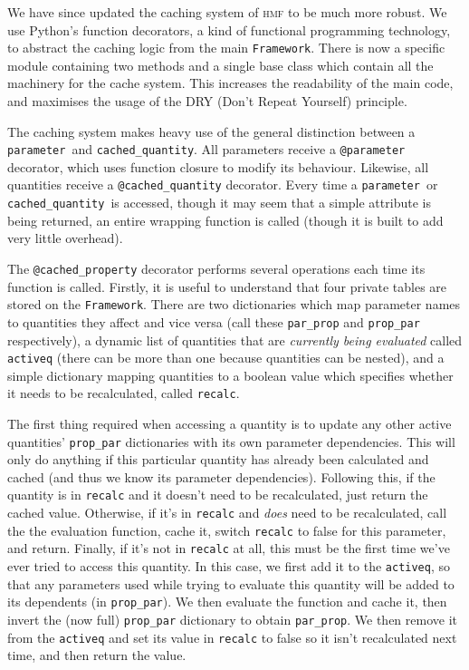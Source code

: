 \documentclass[5p,aas_macros]{elsarticle}
\newcommand{\framework}{\texttt{Framework}}
\newcommand{\parameter}{\texttt{parameter}}
\newcommand{\cached}{\texttt{cached\_quantity}}
\begin{document}
We have since updated the caching system of \textsc{hmf} to be much more robust. We use Python's function decorators, a kind of functional programming technology, to abstract the caching logic from the main \framework. There is now a specific module containing two methods and a single base class which contain all the machinery for the cache system. This increases the readability of the main code, and maximises the usage of the DRY (Don't Repeat Yourself) principle. 

The caching system makes heavy use of the general distinction between a \parameter\ and \cached. All parameters receive a \verb|@parameter| decorator, which uses function closure to modify its behaviour. Likewise, all quantities receive a \verb|@cached_quantity| decorator.
Every time a \parameter\ or \cached\ is accessed, though it may seem that a simple attribute is being returned, an entire wrapping function is called (though it is built to add very little overhead).

The \verb|@cached_property| decorator performs several operations each time its function is called. Firstly, it is useful to understand that four private tables are stored on the \framework. There are two dictionaries which map parameter names to quantities they affect and vice versa (call these \verb|par_prop| and \verb|prop_par| respectively), a dynamic list of quantities that are \textit{currently being evaluated} called \verb|activeq| (there can be more than one because quantities can be nested), and a simple dictionary mapping quantities to a boolean value which specifies whether it needs to be recalculated, called \verb|recalc|.

The first thing required when accessing a quantity is to update any other active quantities' \verb|prop_par| dictionaries with its own parameter dependencies. This will only do anything if this particular quantity has already been calculated and cached (and thus we know its parameter dependencies). 
Following this, if the quantity is in \verb|recalc| and it doesn't need to be recalculated, just return the cached value.
Otherwise, if it's in \verb|recalc| and \textit{does} need to be recalculated, call the the evaluation function, cache it, switch \verb|recalc| to false for this parameter, and return.
Finally, if it's not in \verb|recalc| at all, this must be the first time we've ever tried to access this quantity. In this case, we first add it to the \verb|activeq|, so that any parameters used while trying to evaluate this quantity will be added to its dependents (in \verb|prop_par|). 
We then evaluate the function and cache it, then invert the (now full) \verb|prop_par| dictionary to obtain \verb|par_prop|. We then remove it from the \verb|activeq| and set its value in \verb|recalc| to false so it isn't recalculated next time, and then return the value.
\end{document}
